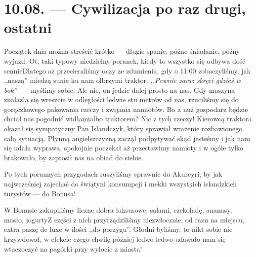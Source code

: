 \chapter*{10.08. --- Cywilizacja po raz drugi, ostatni}

Początek dnia można streścić krótko --- długie spanie, późne śniadanie, późny wyjazd. Ot, taki typowy niedzielny poranek, kiedy to wszystko się odbywa dość sennie\textellipsis Dlatego aż przecieraliśmy oczy ze zdumienia, gdy o 11:00 zobaczyliśmy, jak ,,naszą'' miedzą sunie ku nam olbrzymi traktor. \emph{,,Pewnie zaraz skręci gdzieś w bok''} ---- myślimy sobie. Ale nie, on jedzie dalej prosto na nas. Gdy maszyna znalazła się wreszcie w odległości ledwie stu metrów od nas, rzuciliśmy się do gorączkowego pakowania rzeczy i zwijania namiotów. Bo a nuż gospodarz będzie chciał nas pogodnić widłami\textellipsis albo traktorem? Nic z tych rzeczy! Kierowcą traktora okazał się sympatyczny Pan Islandczyk, który sprawiał wrażenie rozbawionego całą sytuacją. Płynną angielszczyzną zaczął podpytywać skąd jesteśmy i jak nam się udała wyprawa, spokojnie poczekał aż przestawimy namioty i w ogóle tylko brakowało, by zaprosił nas na obiad do siebie.

Po tych porannych przygodach ruszyliśmy sprawnie do Akureyri, by jak najwcześniej zajechać do świątyni konsumpcji i mekki wszystkich islandzkich turystów --- do Bonusa!


W Bonusie zakupiliśmy liczne dobra luksusowe: salami, czekoladę, ananasy, masło, jogurty\textellipsis Z części z nich przyrządziliśmy niezwłocznie, od razu na miejscu, extra paszę de luxe w ilości ,,do porzygu''. Głodni byliśmy, to nikt sobie nie krzywdował, w efekcie czego chwilę później ledwo-ledwo udawało nam się wtaczoczyć na pagórki przy wylocie z miasta!


